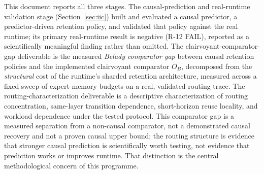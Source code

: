 This document reports all three stages. The causal-prediction and
real-runtime validation stage (Section~\ref{sec:iic}) built and evaluated a causal
predictor, a predictor-driven retention policy, and validated that
policy against the real runtime; its primary real-runtime result is
negative (R-12 FAIL), reported as a scientifically meaningful
finding rather than omitted. The clairvoyant-comparator-gap deliverable is the measured
\emph{Belady comparator gap} between causal retention policies and the
implemented clairvoyant comparator $O_B$, decomposed from the
\emph{structural} cost of the runtime's sharded retention architecture,
measured across a fixed sweep of expert-memory budgets on a real,
validated routing trace. The routing-characterization deliverable is a descriptive
characterization of routing concentration, same-layer transition
dependence, short-horizon reuse locality, and workload dependence under the
tested protocol. This comparator gap is a measured separation from a
non-causal comparator, not a demonstrated causal recovery and not a proven
causal upper bound; the routing structure is evidence that stronger causal
prediction is scientifically worth testing, not evidence that prediction
works or improves runtime. That distinction is the central methodological
concern of this programme.

